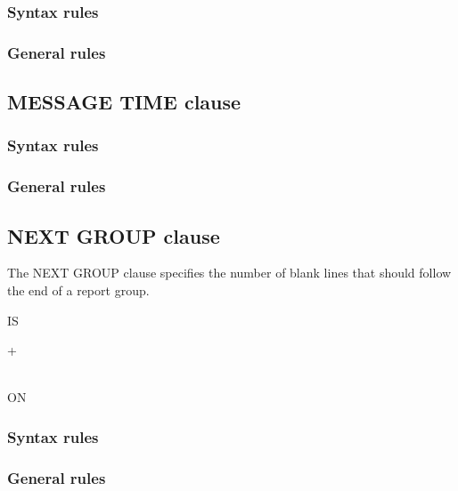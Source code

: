 \subsubsection{Syntax rules}

\subsubsection{General rules}

\subsection{MESSAGE TIME clause}

\begin{syntax}[\deletedcolour]
\end{syntax}

\subsubsection{Syntax rules}

\subsubsection{General rules}

\subsection{NEXT GROUP clause}

The NEXT GROUP clause specifies the number of blank lines that should follow the end of a report group.

\begin{syntax}
    IS
  \begin{1=}
    \begin{0-1}
      + \\
    \end{0-1}
    \integer \\
    ON  
  \end{1=}
\end{syntax}

\subsubsection{Syntax rules}

\subsubsection{General rules}

